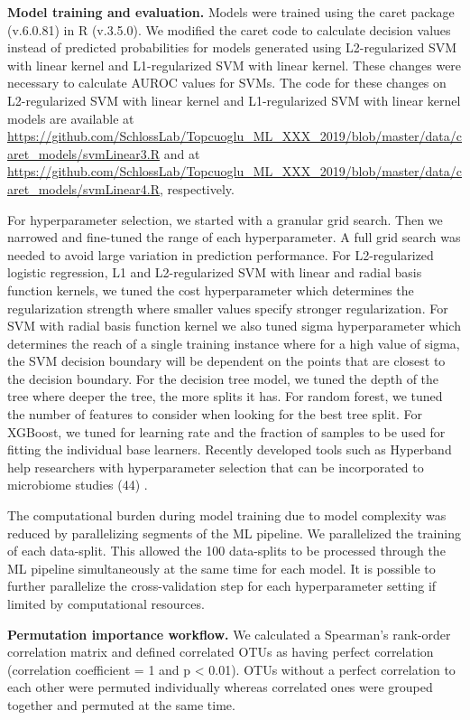 \documentclass[11pt,]{article}
\begin{document}
\textbf{Model training and evaluation.} Models were trained using the
caret package (v.6.0.81) in R (v.3.5.0). We modified the caret code to
calculate decision values instead of predicted probabilities for models
generated using L2-regularized SVM with linear kernel and L1-regularized
SVM with linear kernel. These changes were necessary to calculate AUROC
values for SVMs. The code for these changes on L2-regularized SVM with
linear kernel and L1-regularized SVM with linear kernel models are
available at
\url{https://github.com/SchlossLab/Topcuoglu_ML_XXX_2019/blob/master/data/caret_models/svmLinear3.R}
and at
\url{https://github.com/SchlossLab/Topcuoglu_ML_XXX_2019/blob/master/data/caret_models/svmLinear4.R},
respectively.

For hyperparameter selection, we started with a granular grid search.
Then we narrowed and fine-tuned the range of each hyperparameter. A full
grid search was needed to avoid large variation in prediction
performance. For L2-regularized logistic regression, L1 and
L2-regularized SVM with linear and radial basis function kernels, we
tuned the cost hyperparameter which determines the regularization
strength where smaller values specify stronger regularization. For SVM
with radial basis function kernel we also tuned sigma hyperparameter
which determines the reach of a single training instance where for a
high value of sigma, the SVM decision boundary will be dependent on the
points that are closest to the decision boundary. For the decision tree
model, we tuned the depth of the tree where deeper the tree, the more
splits it has. For random forest, we tuned the number of features to
consider when looking for the best tree split. For XGBoost, we tuned for
learning rate and the fraction of samples to be used for fitting the
individual base learners. Recently developed tools such as Hyperband
help researchers with hyperparameter selection that can be incorporated
to microbiome studies (44) .

The computational burden during model training due to model complexity
was reduced by parallelizing segments of the ML pipeline. We
parallelized the training of each data-split. This allowed the 100
data-splits to be processed through the ML pipeline simultaneously at
the same time for each model. It is possible to further parallelize the
cross-validation step for each hyperparameter setting if limited by
computational resources.

\textbf{Permutation importance workflow.} We calculated a Spearman's
rank-order correlation matrix and defined correlated OTUs as having
perfect correlation (correlation coefficient = 1 and p \textless{}
0.01). OTUs without a perfect correlation to each other were permuted
individually whereas correlated ones were grouped together and permuted
at the same time.
\end{document}
